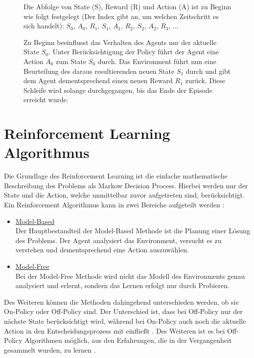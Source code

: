 \begin{figure} [h]
\begin{minipage}[t]{1\textwidth}
\vspace{0pt}
Die Abfolge von State (S), Reward (R) und Action (A) ist zu Beginn wie folgt festgelegt (Der Index gibt an, um welchen Zeitschritt es sich handelt): $S_{0}$, $A_{0}$, $R_{1}$, $S_{1}$, $A_{1}$, $R_{2}$, $S_{2}$, $A_{2}$, $R_{3}$, ...   

Zu Beginn beeinflusst das Verhalten des Agents nur der aktuelle State $S_{0}$. Unter Berücksichtigung der Policy führt der Agent eine Action $A_{0}$ zum State $S_{0}$ durch. Das Environment führt nun eine Beurteilung des daraus resultierenden neuen State $S_{1}$ durch und gibt dem Agent dementsprechend einen neuen Reward $R_{1}$ zurück. Diese Schleife wird solange durchgegangen, bis das Ende der Episode erreicht wurde.

\end{minipage}
\end{figure}
\clearpage

\section{Reinforcement Learning Algorithmus}
\label{sect:RL_Algo}
Die Grundlage des Reinforcement Learning ist die einfache mathematische Beschreibung des Problems als Markow Decision Process. Hierbei werden nur der State und die Action, welche unmittelbar zuvor aufgetreten sind, berücksichtigt.
Ein Reinforcement Algorithmus kann in zwei Bereiche aufgeteilt werden \cite{CarnegieMellonUniversity}: 
\begin{itemize}
\item \underline{Model-Based} \\
Der Hauptbestandteil der Model-Based Methode ist die Planung einer Lösung des Problems. Der Agent analysiert das Environment, versucht es zu verstehen und dementsprechend eine Action auszuwählen.
\item \underline{Model-Free} \\
Bei der Model-Free Methode wird nicht das Modell des Environments genau analysiert und erlernt, sondern das Lernen erfolgt nur durch Probieren.
\end{itemize}
Des Weiteren können die Methoden dahingehend unterschieden werden, ob sie On-Policy oder Off-Policy sind. Der Unterschied ist, dass bei Off-Policy nur der nächste State berücksichtigt wird, während bei On-Policy auch noch die aktuelle Action in den Entscheidungsprozess mit einfließt \cite{aracom}. Des Weiteren ist es bei Off-Policy Algorithmen möglich, aus den Erfahrungen, die in der Vergangenheit gesammelt wurden, zu lernen \cite{ppo_git}. \\


